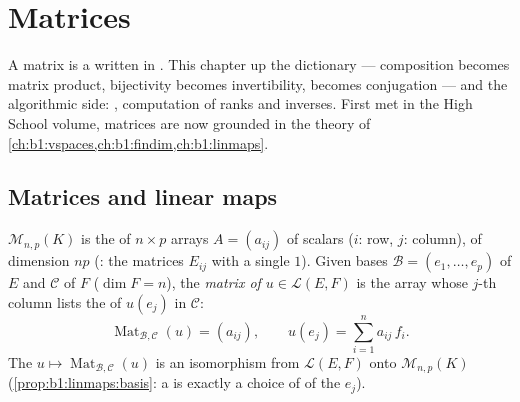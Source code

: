 \chapter{Matrices}\label{ch:b1:matrices}

A matrix is a  written in . This chapter 
up the dictionary --- composition becomes matrix product, bijectivity
becomes invertibility,  becomes conjugation --- and
the algorithmic side: , computation of ranks and
inverses. First met in the High School volume, matrices are now
grounded in the theory of
\cref{ch:b1:vspaces,ch:b1:findim,ch:b1:linmaps}.

\section{Matrices and linear maps}

\begin{definition}\label{def:b1:matrices:def}
$\mathcal{M}_{n,p}(K)$ is the  of $n \times p$ arrays $A
= (a_{ij})$ of scalars ($i$: row, $j$: column), of dimension $np$
(: the matrices $E_{ij}$ with a single $1$). Given bases
$\mathcal{B} = (e_1, \dots, e_p)$ of $E$ and $\mathcal{C}$ of $F$
($\dim F = n$), the \emph{matrix of $u \in \mathcal{L}(E, F)$} is
the array whose $j$-th column lists the  of $u(e_j)$ in
$\mathcal{C}$:
\[
\operatorname{Mat}_{\mathcal{B},\mathcal{C}}(u) = (a_{ij}),
\qquad u(e_j) = \sum_{i=1}^{n} a_{ij}\, f_i .
\]
The  $u \mapsto \operatorname{Mat}_{\mathcal{B},\mathcal{C}}(u)$
is an isomorphism from $\mathcal{L}(E, F)$ onto
$\mathcal{M}_{n,p}(K)$ (\cref{prop:b1:linmaps:basis}: a 
is exactly a choice of  of the $e_j$).
\end{definition}


